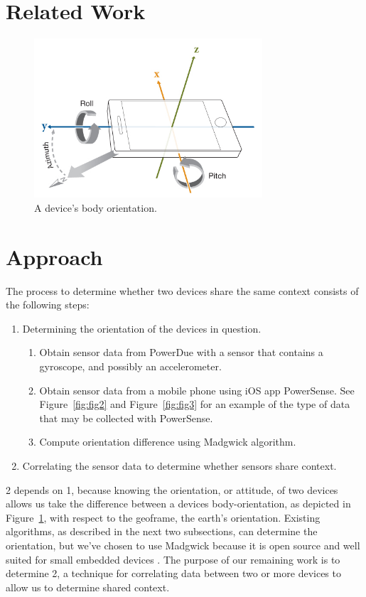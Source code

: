\documentclass[journal]{IEEEtranTIE}
\begin{document}
\section{Related Work}


\begin{figure}[!t]\centering
	\includegraphics[width=8.5cm]{phoneOrientation}
	\caption{A device's body orientation.}\label{fig:fig1}
\end{figure}


\section{Approach}

The process to determine whether two devices share the same context consists of
the following steps:

\begin{enumerate}
\item Determining the orientation of the devices in question.
\begin{enumerate}
\item Obtain sensor data from PowerDue with a sensor that contains a gyroscope,
      and possibly an accelerometer.
\item Obtain sensor data from a mobile phone using iOS app PowerSense. See
      Figure~\ref{fig:fig2} and Figure~\ref{fig:fig3} for an example of the type
      of data that may be collected with PowerSense.
\item Compute orientation difference using Madgwick algorithm.
\end{enumerate}
\item Correlating the sensor data to determine whether sensors share context.
\end{enumerate}

2 depends on 1, because knowing the orientation, or attitude, of two devices
allows us take the difference between a devices body-orientation, as depicted in
Figure~\ref{fig:fig1}, with respect to the geoframe, the earth's orientation. Existing
algorithms, as described in the next two subsections, can determine the
orientation, but we've chosen to use Madgwick because it is open source and well
suited for small embedded devices \cite{Madgwick}. The purpose of our remaining
work is to determine 2, a technique for correlating data between two or more
devices to allow us to determine shared context.
\end{document}
